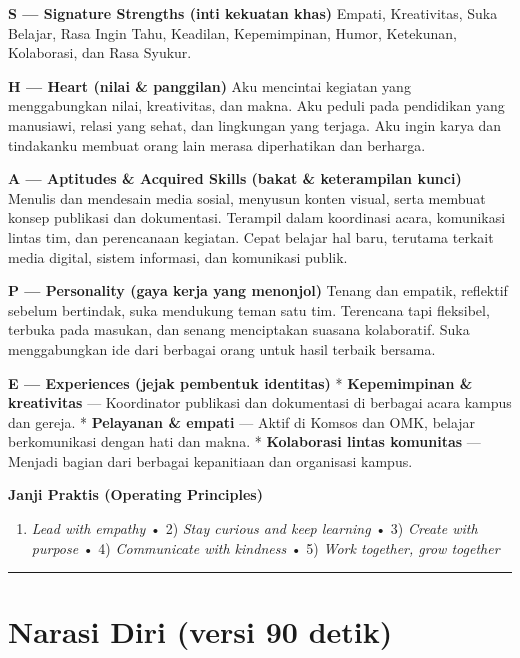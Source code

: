 \documentclass[
  letterpaper,
  DIV=11,
  numbers=noendperiod]{scrreprt}
\providecommand{\tightlist}{%
  \setlength{\itemsep}{0pt}\setlength{\parskip}{0pt}}
\begin{document}
\textbf{S --- Signature Strengths (inti kekuatan khas)} Empati,
Kreativitas, Suka Belajar, Rasa Ingin Tahu, Keadilan, Kepemimpinan,
Humor, Ketekunan, Kolaborasi, dan Rasa Syukur.

\textbf{H --- Heart (nilai \& panggilan)} Aku mencintai kegiatan yang
menggabungkan nilai, kreativitas, dan makna. Aku peduli pada pendidikan
yang manusiawi, relasi yang sehat, dan lingkungan yang terjaga. Aku
ingin karya dan tindakanku membuat orang lain merasa diperhatikan dan
berharga.

\textbf{A --- Aptitudes \& Acquired Skills (bakat \& keterampilan
kunci)} Menulis dan mendesain media sosial, menyusun konten visual,
serta membuat konsep publikasi dan dokumentasi. Terampil dalam
koordinasi acara, komunikasi lintas tim, dan perencanaan kegiatan. Cepat
belajar hal baru, terutama terkait media digital, sistem informasi, dan
komunikasi publik.

\textbf{P --- Personality (gaya kerja yang menonjol)} Tenang dan
empatik, reflektif sebelum bertindak, suka mendukung teman satu tim.
Terencana tapi fleksibel, terbuka pada masukan, dan senang menciptakan
suasana kolaboratif. Suka menggabungkan ide dari berbagai orang untuk
hasil terbaik bersama.

\textbf{E --- Experiences (jejak pembentuk identitas)} *
\textbf{Kepemimpinan \& kreativitas} --- Koordinator publikasi dan
dokumentasi di berbagai acara kampus dan gereja. * \textbf{Pelayanan \&
empati} --- Aktif di Komsos dan OMK, belajar berkomunikasi dengan hati
dan makna. * \textbf{Kolaborasi lintas komunitas} --- Menjadi bagian
dari berbagai kepanitiaan dan organisasi kampus.

\textbf{Janji Praktis (Operating Principles)}

\begin{enumerate}
\def\labelenumi{\arabic{enumi}.}
\tightlist
\item
  \emph{Lead with empathy} • 2) \emph{Stay curious and keep learning} •
  3) \emph{Create with purpose} • 4) \emph{Communicate with kindness} •
  5) \emph{Work together, grow together}
\end{enumerate}

\begin{center}\rule{0.5\linewidth}{0.5pt}\end{center}

\section{Narasi Diri (versi 90 detik)}\label{narasi-diri-versi-90-detik}
\end{document}
